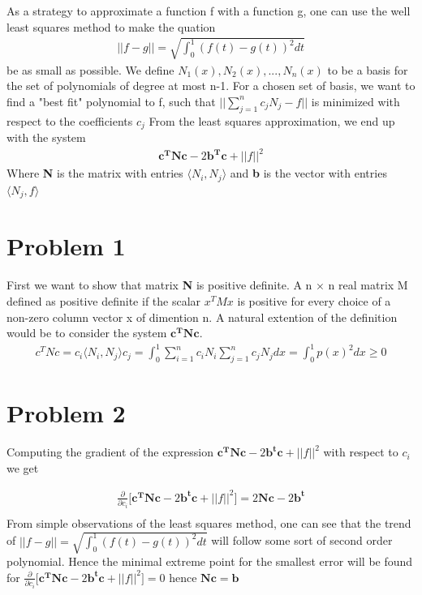 \documentclass[a4paper,norsk]{article}
\begin{document}
\maketitle


As a strategy to approximate a function f with a function g, one can use the well least squares method to make the quation
\begin{align*}
||f - g|| = \sqrt{\int_0^1 (f(t) - g(t) )^2 dt }	
\end{align*} 
be as small as possible.
We define ${N_1(x), N_2(x), ..., N_n(x)}$ to be a basis for the set of polynomials of degree at most n-1. For a chosen set of basis, we want to 
find a "best fit" polynomial to f, such that $||\sum_{j=1}^n c_j N_j - f ||$ is minimized with respect to the coefficients $c_j$
From the least squares approximation, we end up with the system
\begin{align*}
\mathbf{c^T N c} -2\mathbf{b^T c} + ||f||^2
\end{align*}
Where \textbf{N} is the matrix with entries $\langle N_i, N_j \rangle$ and \textbf{b} is the vector with entries $\langle N_j, f \rangle$ 

\section*{Problem 1}
First we want to show that matrix \textbf{N} is positive definite.  A n × n real matrix M defined as positive definite if the scalar $ x^{T}M x$ is positive for every choice of a non-zero column vector x of dimention n. A natural extention of the definition would be to consider the system $\mathbf{c^TNc}$.
\begin{align*}
c^TNc = c_i \langle N_i, N_j \rangle c_j = \int_0^1 \sum_{i=1}^n c_i N_i \sum_{j=1}^n c_j N_j dx = \int_0^1 p(x)^2 dx  \geq 0
\end{align*}

\section*{Problem 2}
Computing the gradient of the expression $\mathbf{c^T N c} -2 \mathbf{b^t c} + ||f||^2 $ with respect to $c_i$ we get

\begin{align*}
\frac{\partial}{\partial c_i} \Big[ \mathbf{c^T N c} -2 \mathbf{b^t c} + ||f||^2\Big] = 2\mathbf{Nc} - 2\mathbf{b^t} \\
\end{align*}
From simple observations of the least squares method, one can see that the trend of $||f - g|| = \sqrt{\int_0^1 (f(t) - g(t) )^2 dt }$ will follow some sort of second order polynomial. Hence the minimal
extreme point for the smallest error will be found for 
$\frac{\partial}{\partial c_i} \Big[ \mathbf{c^T N c} -2 \mathbf{b^t c} + ||f||^2\Big] = 0 $ hence $\mathbf{Nc} = \mathbf{b}$ 
\end{document}
